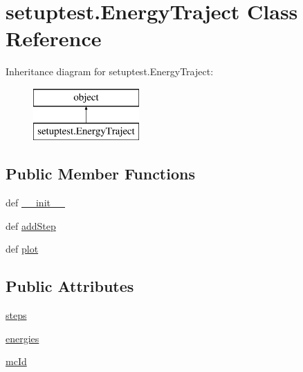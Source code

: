 \hypertarget{classsetuptest_1_1_energy_traject}{\section{setuptest.\-Energy\-Traject Class Reference}
\label{classsetuptest_1_1_energy_traject}
}
Inheritance diagram for setuptest.\-Energy\-Traject\-:\begin{figure}[H]
\begin{center}
\leavevmode
\includegraphics[height=2.000000cm]{classsetuptest_1_1_energy_traject}
\end{center}
\end{figure}
\subsection*{Public Member Functions}
\begin{DoxyCompactItemize}
\item 
def \hyperlink{classsetuptest_1_1_energy_traject_a4d62ec6c7371f2082ab597fd91362135}{\-\_\-\-\_\-init\-\_\-\-\_\-}
\item 
def \hyperlink{classsetuptest_1_1_energy_traject_a48814b9f443420bc62108c1d1041a18c}{add\-Step}
\item 
def \hyperlink{classsetuptest_1_1_energy_traject_afb65af6cd074fb222a0046b807f7afb6}{plot}
\end{DoxyCompactItemize}
\subsection*{Public Attributes}
\begin{DoxyCompactItemize}
\item 
\hyperlink{classsetuptest_1_1_energy_traject_a1b6ed50b43cacca55b035725f61209d4}{steps}
\item 
\hyperlink{classsetuptest_1_1_energy_traject_a42afaf404b3751ccd71132f940cca86f}{energies}
\item 
\hyperlink{classsetuptest_1_1_energy_traject_a1b72e7ba38f589bc5d8da9bdb6a2ab4a}{mc\-Id}
\end{DoxyCompactItemize}


